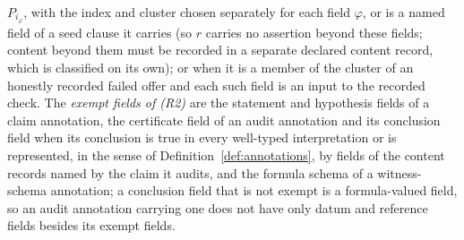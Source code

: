 \documentclass[11pt]{article}
\theoremstyle{definition}
\begin{document}
\(P_{i_\varphi}\), with the index and cluster chosen separately for each field
\(\varphi\), or is a named field of a seed clause it carries (so \(r\) carries no assertion beyond these fields; content beyond them must be recorded in a separate declared content record, which is classified on its own); or when it is a member of the cluster of an honestly
recorded failed offer and each such field is an input to the recorded check.
The \emph{exempt fields of (R2)} are the statement and hypothesis fields of a
claim annotation, the certificate field of an audit annotation and its conclusion field when its conclusion is true in every well-typed interpretation or is represented, in the sense of Definition~\ref{def:annotations}, by fields of the content records named by the claim it audits,
and the formula schema of a witness-schema annotation; a conclusion field that is not exempt is a formula-valued field, so an audit annotation carrying one does not have only datum and reference fields besides its exempt fields.
\end{document}

